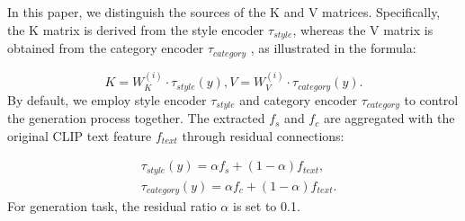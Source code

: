 In this paper, we distinguish the sources of the K and V matrices. Specifically, the K matrix is derived from the style encoder $\tau_{style}$, whereas the V matrix is obtained from the category encoder $\tau_{category}$ , as illustrated in the formula:

\begin{equation}
K=W_K^{(i)} \cdot \tau_{style}(y), V=W_V^{(i)} \cdot \tau_{category}(y).
\end{equation}
By default, we employ style encoder $\tau_{style}$ and category encoder $\tau_{category}$ to control the generation process together. 
The extracted $f_s$ and $f_c$ are aggregated with the original CLIP text feature $f_{text}$ through residual connections:

\begin{equation}
    \begin{aligned}
    &\tau_{style}(y) = \alpha f_{s} + (1- \alpha) f_{text},\\
    &\tau_{category}(y) = \alpha f_{c} + (1- \alpha) f_{text}.
    \end{aligned}
\label{eq:alpha}
\end{equation}
For generation task, the residual ratio $\alpha$ is set to 0.1.



